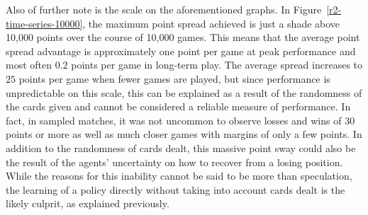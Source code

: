 Also of further note is the scale on the aforementioned graphs.
%
In Figure~\ref{r2-time-series-10000},
the maximum point spread achieved is just a shade above 10,000 points
over the course of 10,000 games.
%
This means that the average point spread advantage is approximately 
one point per game at peak performance\textemdash
and most often $0.2$ points per game\textemdash
in long-term play.
%
The average spread increases to $25$ points per game when fewer games are 
played,
but since performance is unpredictable on this scale,
this can be explained as a result of the randomness of the cards given
and cannot be considered a reliable measure of performance.
%
In fact,
in sampled matches,
it was not uncommon to observe losses and wins of 30 points or more
as well as much closer games with margins of only a few points.
%
In addition to the randomness of cards dealt,
this massive point sway could also be the result of the agents' uncertainty on 
how to recover from a losing position.
%
While the reasons for this inability cannot be said to be more than speculation,
the learning of a policy directly without taking into account cards dealt
is the likely culprit,
as explained previously.



%
